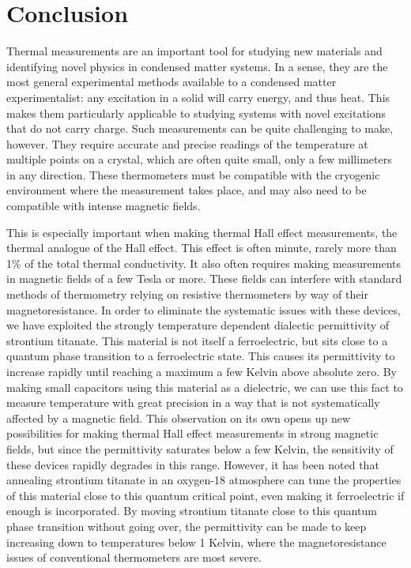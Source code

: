 \documentclass{thesis-umich}
\begin{document}
\chapter{Conclusion}

Thermal measurements are an important tool for studying new materials and identifying novel physics in condensed matter systems. In a sense, they are the most general experimental methods available to a condensed matter experimentalist: any excitation in a solid will carry energy, and thus heat. This makes them particularly applicable to studying systems with novel excitations that do not carry charge. Such measurements can be quite challenging to make, however. They require accurate and precise readings of the temperature at multiple points on a crystal, which are often quite small, only a few millimeters in any direction. These thermometers must be compatible with the cryogenic environment where the measurement takes place, and may also need to be compatible with intense magnetic fields.

This is especially important when making thermal Hall effect measurements, the thermal analogue of the Hall effect. This effect is often minute, rarely more than 1\% of the total thermal conductivity. It also often requires making measurements in magnetic fields of a few Tesla or more. These fields can interfere with standard methods of thermometry relying on resistive thermometers by way of their magnetoresistance. In order to eliminate the systematic issues with these devices, we have exploited the strongly temperature dependent dialectic permittivity of strontium titanate. This material is not itself a ferroelectric, but sits close to a quantum phase transition to a ferroelectric state. This causes its permittivity to increase rapidly until reaching a maximum a few Kelvin above absolute zero. By making small capacitors using this material as a dielectric, we can use this fact to measure temperature with great precision in a way that is not systematically affected by a magnetic field. This observation on its own opens up new possibilities for making thermal Hall effect measurements in strong magnetic fields, but since the permittivity saturates below a few Kelvin, the sensitivity of these devices rapidly degrades in this range. However, it has been noted that annealing strontium titanate in an oxygen-18 atmosphere can tune the properties of this material close to this quantum critical point, even making it ferroelectric if enough is incorporated. By moving strontium titanate close to this quantum phase transition without going over, the permittivity can be made to keep increasing down to temperatures below 1 Kelvin, where the magnetoresistance issues of conventional thermometers are most severe. 
\end{document}

